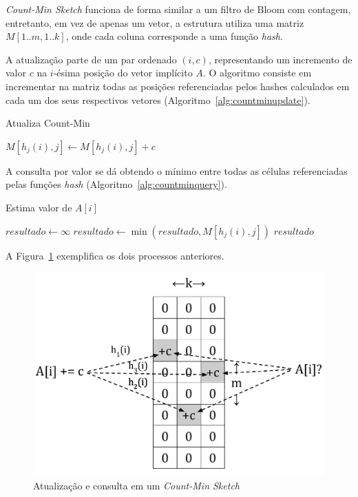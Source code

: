 \emph{Count-Min Sketch} funciona de forma similar a um filtro de Bloom com contagem, entretanto, em vez de apenas um vetor, a estrutura utiliza uma matriz $M[1..m, 1..k]$, onde cada coluna corresponde a uma função \emph{hash}.

A atualização parte de um par ordenado $(i, c)$, representando um incremento de valor $c$ na $i$-ésima posição do vetor implícito $A$. O algoritmo consiste em incrementar na matriz todas as posições referenciadas pelos hashes calculados em cada um dos seus respectivos vetores (Algoritmo~\ref{alg:countminupdate}). 

\begin{algorithm}
\linespread{1}\selectfont
\caption{Atualiza Count-Min}
\label{alg:countminupdate}
\begin{algorithmic}[1]
        \State $M[h_j(i), j] \gets M[h_j(i), j] + c$
	\EndFor
\EndProcedure
\end{algorithmic}
\end{algorithm}

A consulta por valor se dá obtendo o mínimo entre todas as células referenciadas pelas funções \emph{hash}  (Algoritmo~\ref{alg:countminquery}).

\begin{algorithm}
\linespread{1}\selectfont
\caption{Estima valor de $A[i]$}
\label{alg:countminquery}
\begin{algorithmic}[1]
    \State $resultado \gets \infty$ 
        \State $resultado \gets \min(resultado, M[h_j(i), j])$
	\EndFor
	\Return $resultado$
\EndFunction
\end{algorithmic}
\end{algorithm}

A Figura~\ref{fig:countmin1} exemplifica os dois processos anteriores.

\begin{figure}[!htbp]
  \centering
  \includegraphics[scale=0.45]{files/countmin1.pdf}
  \caption{Atualização e consulta em um \emph{Count-Min Sketch}}
  \label{fig:countmin1}
\end{figure}

